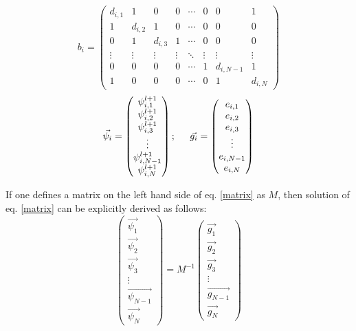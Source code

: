 \begin{equation}
 b_i=
 \begin{pmatrix}
  d_{i,1} & 1 & 0 & 0 & \cdots & 0 & 0 & 1 \\
  1 & d_{i,2} & 1 & 0 & \cdots & 0 & 0 & 0 \\
  0 & 1 & d_{i,3} & 1 & \cdots & 0 & 0 & 0 \\
  \vdots  & \vdots & \vdots & \vdots  & \ddots & \vdots & \vdots & \vdots  \\
  0 & 0 & 0 & 0 & \cdots & 1 & d_{i,N-1} & 1 \\
  1 & 0 & 0 & 0 & \cdots & 0 & 1 & d_{i,N}
 \end{pmatrix}
\end{equation}
\begin{equation}
 \vec{\psi_i}=
 \begin{pmatrix}
  \psi^{l+1}_{i, 1} \\
  \psi^{l+1}_{i, 2} \\
  \psi^{l+1}_{i, 3} \\
  \vdots \\
  \psi^{l+1}_{i, N-1} \\
  \psi^{l+1}_{i, N}
 \end{pmatrix};
\hspace{0.2in}
\vec{g_i}=
 \begin{pmatrix}
  e_{i,1} \\
  e_{i,2} \\
  e_{i,3} \\
  \vdots \\
  e_{i,N-1} \\
  e_{i,N}
 \end{pmatrix}
\end{equation}

If one defines a matrix on the left hand side of eq. \eqref{matrix} as $M$, then solution of eq. \eqref{matrix} can be explicitly derived as follows:
\begin{equation}
\label{matrix1}
\begin{pmatrix}
  \vec{\psi_1} \\
  \vec{\psi_2} \\
  \vec{\psi_3} \\
  \vdots \\
  \vec{\psi_{N-1}} \\
  \vec{\psi_N}
 \end{pmatrix} = M^{-1}
\begin{pmatrix}
  \vec{g_1} \\
  \vec{g_2} \\
  \vec{g_3} \\
  \vdots \\
  \vec{g_{N-1}} \\
  \vec{g_{N}}
 \end{pmatrix}
\end{equation}

